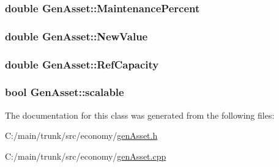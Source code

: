 \label{class_gen_asset_a4cc792433c9594704f995e25d7d0eb8c}
\hypertarget{class_gen_asset_a175efb0dff541ece6897022e94e7fa1e}{
\subsubsection[{MaintenancePercent}]{\setlength{\rightskip}{0pt plus 5cm}double {\bf GenAsset::MaintenancePercent}}}
\label{class_gen_asset_a175efb0dff541ece6897022e94e7fa1e}
\hypertarget{class_gen_asset_acb87eeda54b9490a769f757383c36738}{
\subsubsection[{NewValue}]{\setlength{\rightskip}{0pt plus 5cm}double {\bf GenAsset::NewValue}}}
\label{class_gen_asset_acb87eeda54b9490a769f757383c36738}
\hypertarget{class_gen_asset_af92ef23136201ab80e6464a8749ca9ac}{
\subsubsection[{RefCapacity}]{\setlength{\rightskip}{0pt plus 5cm}double {\bf GenAsset::RefCapacity}}}
\label{class_gen_asset_af92ef23136201ab80e6464a8749ca9ac}
\hypertarget{class_gen_asset_abedb1420aea9a5c382e1cb277f569ef2}{
\subsubsection[{scalable}]{\setlength{\rightskip}{0pt plus 5cm}bool {\bf GenAsset::scalable}}}
\label{class_gen_asset_abedb1420aea9a5c382e1cb277f569ef2}


The documentation for this class was generated from the following files:\begin{DoxyCompactItemize}
\item 
C:/main/trunk/src/economy/\hyperlink{gen_asset_8h}{genAsset.h}\item 
C:/main/trunk/src/economy/\hyperlink{gen_asset_8cpp}{genAsset.cpp}\end{DoxyCompactItemize}

